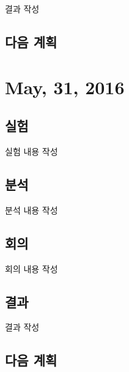 \documentclass{research-note-v1.0}
\begin{document}
결과 작성


\subsection*{다음 계획}


\section*{May, 31, 2016}

\subsection*{실험}

실험 내용 작성

\subsection*{분석}

분석 내용 작성

\subsection*{회의}

회의 내용 작성

\subsection*{결과}

결과 작성


\subsection*{다음 계획}



\end{document}
